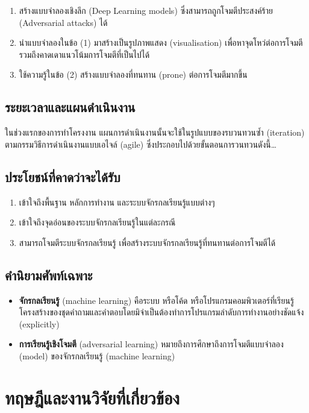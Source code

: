 \documentclass{cpereport}
\begin{document}
\begin{enumerate}
    \item สร้างแบบจำลองเชิงลึก (Deep Learning models) ซึ่งสามารถถูกโจมตีประสงค์ร้าย (Adversarial attacks) ได้
    \item นำแบบจำลองในข้อ (1) มาสร้างเป็นรูปภาพแสดง (visualisation) เพื่อหาจุดโหว่ต่อการโจมตี รวมถึงคาดเดาแนวโน้มการโจมตีที่เป็นไปได้
    \item ใช้ความรู้ในข้อ (2) สร้างแบบจำลองที่ทนทาน (prone) ต่อการโจมตีมากขึ้น
\end{enumerate}

\section{ระยะเวลาและแผนดําเนินงาน}
ในช่วงแรกของการทำโครงงาน แผนการดำเนินงานนั้นจะใช้ในรูปแบบของรบวนทวนซ้ำ (iteration) ตามกรรมวิธีการดำเนินงานแบบเอไจล์ (agile) ซึ่งประกอบไปด้วยขั้นตอนการวนทวนดังนี้\dots

\section{ประโยชน์ที่คาดว่าจะได้รับ}
\begin{enumerate}
    \item เข้าใจถึงพื้นฐาน หลักการทำงาน และระบบจักรกลเรียนรู้แบบต่างๆ
    \item เข้าใจถึงจุดอ่อนของระบบจักรกลเรียนรู้ในแต่ละกรณี
    \item สามารถโจมตีระบบจักรกลเรียนรู้ เพื่อสร้างระบบจักรกลเรียนรู้ที่ทนทานต่อการโจมตีได้
\end{enumerate}

\section{คํานิยามศัพท์เฉพาะ}
\begin{itemize}
    \item \textbf{จักรกลเรียนรู้} (machine learning) คือระบบ หรือโค้ด หรือโปรแกรมคอมพิวเตอร์ที่เรียนรู้โครงสร้างของชุดคำถามและคำตอบโดยมิจำเป็นต้องทำการโปรแกรมลำดับการทำงานอย่างชัดแจ้ง (explicitly) 
    \item \textbf{การเรียนรู้เชิงโจมตี} (adversarial learning) หมายถึงการศึกษาถึงการโจมตีแบบจำลอง (model) ของจักรกลเรียนรู้ (machine learning)
\end{itemize}

\chapter{ทฤษฎีและงานวิจัยที่เกี่ยวข้อง}
\end{document}
